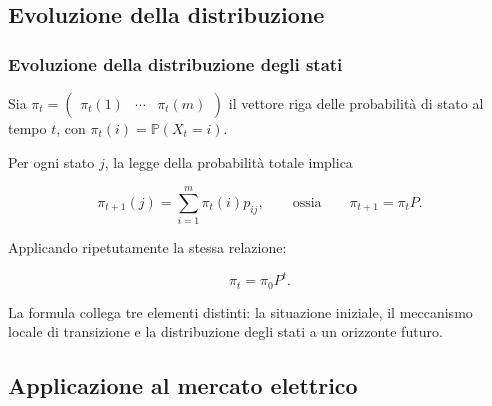 \documentclass[handout]{beamer}%
\providecommand{\Prob}{\mathbb{P}}
\providecommand{\QTR}[2]{\csname #1\endcsname{#2}}
\begin{document}


\subsection{Evoluzione della distribuzione}%

\begin{frame}%
%

\frametitle{Evoluzione della distribuzione degli stati}%
%

%


Sia $\pi_{t}=
\begin{pmatrix}
\pi_{t}(1) & \cdots & \pi_{t}(m)
\end{pmatrix}
$ il vettore riga delle probabilit\`{a} di stato al tempo $t$, con $\pi
_{t}(i)=\Prob(X_{t}=i)$.

\medskip

Per ogni stato $j$, la legge della probabilit\`{a} totale implica%

\[
\pi_{t+1}(j) = \sum_{i=1}^{m} \pi_{t}(i)p_{ij}, \qquad\text{ossia} \qquad
\pi_{t+1}=\pi_{t}P.
\]


\medskip

Applicando ripetutamente la stessa relazione:%

\[
\pi_{t}=\pi_{0}P^{t}.
\]


\medskip

\begin{center}
{\small La formula collega tre elementi distinti: la situazione iniziale, il
meccanismo locale di transizione e la distribuzione degli stati a un orizzonte
futuro.}
\end{center}%

\transboxout
\end{frame}%




\subsection{Applicazione al mercato elettrico}%
\end{document}
